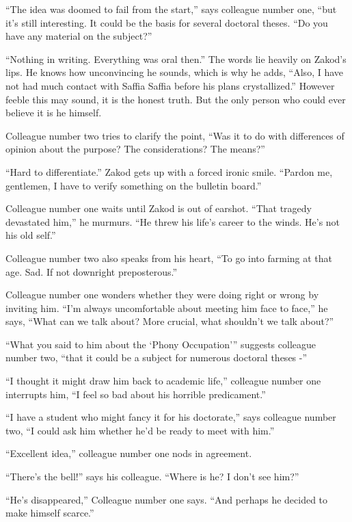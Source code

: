 \documentclass[twoside,11pt]{book}
\begin{document}
``The idea was doomed to fail from the start,'' says colleague number one, ``but it's still
interesting. It could be the basis for several doctoral theses. ``Do you have any material on the
subject?''

``Nothing in writing. Everything was oral then.'' The words lie heavily on Zakod's lips. He
knows how unconvincing he sounds, which is why he adds, ``Also, I have not had much contact with Saffia
Saffia before his plans crystallized.'' However feeble this may sound, it is the honest truth. But the
only person who could ever believe it is he himself.

Colleague number two tries to clarify the point, ``Was it to do with differences of opinion about the
purpose? The considerations? The means?''

``Hard to differentiate.'' Zakod gets up with a forced ironic smile. ``Pardon me,
gentlemen, I have to verify something on the bulletin board.''

Colleague number one waits until Zakod is out of earshot. ``That tragedy devastated him,'' he
murmurs. ``He threw his life's career to the winds. He's not his old self.''

Colleague number two also speaks from his heart, ``To go into farming at that age. Sad. If not downright
preposterous.''

Colleague number one wonders whether they were doing right or wrong by inviting him. ``I'm always uncomfortable
about meeting him face to face,'' he says, ``What can we talk about? More crucial, what shouldn't we talk
about?''

``What you said to him about the {`Phony Occupation'}'' suggests colleague number two, ``that it could be a
subject for numerous doctoral theses -''

``I thought it might draw him back to academic life,'' colleague number one interrupts him, ``I feel so bad
about his horrible predicament.''

``I have a student who might fancy it for his doctorate,'' says colleague number two, ``I could ask him
whether he'd be ready to meet with him.''

``Excellent idea,'' colleague number one nods in agreement.

``There's the bell!'' says his colleague. ``Where is he? I don't see him?''

``He's disappeared,'' Colleague number one says. ``And perhaps he decided to make himself
scarce.''


\bigskip
\end{document}
